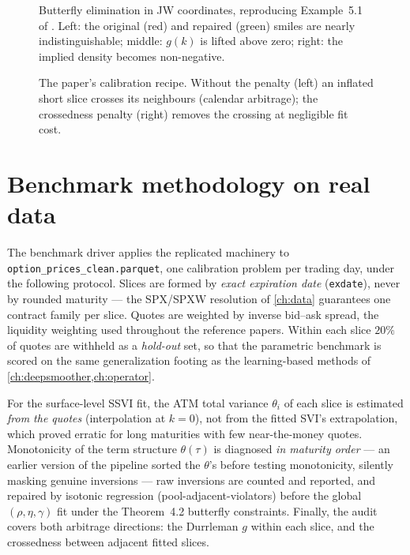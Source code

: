 \begin{figure}[t]
  \centering
  \caption[Butterfly elimination via jump-wings (Example 5.1)]{Butterfly
  elimination in JW coordinates, reproducing Example~5.1 of
  \cite{gatheral2014arbitrage}. Left: the original (red) and repaired (green)
  smiles are nearly indistinguishable; middle: $g(k)$ is lifted above zero;
  right: the implied density becomes non-negative.}
  \label{fig:elimination}
\end{figure}

\begin{figure}[t]
  \centering
  \caption[The \S5.2 recipe: crossedness penalty]{The paper's calibration
  recipe. Without the penalty (left) an inflated short slice crosses its
  neighbours (calendar arbitrage); the crossedness penalty (right) removes
  the crossing at negligible fit cost.}
  \label{fig:recipe}
\end{figure}

\section{Benchmark methodology on real data}
\label{sec:benchmethod}

The benchmark driver applies the replicated machinery to
\texttt{option\_prices\_clean.parquet}, one calibration problem per trading
day, under the following protocol. Slices are formed by \emph{exact
expiration date} (\texttt{exdate}), never by rounded maturity --- the SPX/SPXW
resolution of \cref{ch:data} guarantees one contract family per slice.
Quotes are weighted by inverse bid--ask spread, the liquidity weighting used
throughout the reference papers. Within each slice $20\%$ of quotes are
withheld as a \emph{hold-out} set, so that the parametric benchmark is scored
on the same generalization footing as the learning-based methods of
\cref{ch:deepsmoother,ch:operator}.

For the surface-level SSVI fit, the ATM total variance $\theta_i$ of each
slice is estimated \emph{from the quotes} (interpolation at $k=0$), not from
the fitted SVI's extrapolation, which proved erratic for long maturities with
few near-the-money quotes. Monotonicity of the term structure
$\theta(\tau)$ is diagnosed \emph{in maturity order} --- an earlier version of
the pipeline sorted the $\theta$'s before testing monotonicity, silently
masking genuine inversions --- raw inversions are counted and reported, and
repaired by isotonic regression (pool-adjacent-violators) before the global
$(\rho,\eta,\gamma)$ fit under the Theorem~4.2 butterfly constraints.
Finally, the audit covers both arbitrage directions: the Durrleman $g$
within each slice, and the crossedness between adjacent fitted slices.

